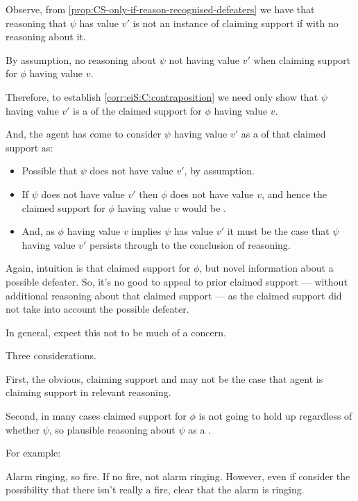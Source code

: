 \begin{note}
  Observe, from \autoref{prop:CS-only-if-reason-recognised-defeaters} we have that reasoning that \(\psi\) has value \(v'\) is not an instance of claiming support {\color{red} if \requ{} with no reasoning about it}.

  By assumption, no reasoning about \(\psi\) not having value \(v'\) when claiming support for \(\phi\) having value \(v\).

  Therefore, to establish \autoref{corr:eiS:C:contraposition} we need only show that \(\psi\) having value \(v'\) is a \requ{} of the claimed support for \(\phi\) having value \(v\).

  And, the agent has come to consider \(\psi\) having value \(v'\) as a \requ{} of that claimed support as:
  \begin{itemize}
  \item Possible that \(\psi\) does not have value \(v'\), by assumption.
  \item If \(\psi\) does not have value \(v'\) then \(\phi\) does not have value \(v\), and hence the claimed support for \(\phi\) having value \(v\) would be \misled{}.
  \item And, as \(\phi\) having value \(v\) implies \(\psi\) has value \(v'\) it must be the case that \(\psi\) having value \(v'\) persists through to the conclusion of reasoning.
  \end{itemize}
\end{note}

\begin{note}
  Again, intuition is that claimed support for \(\phi\), but novel information about a possible defeater.
  So, it's no good to appeal to prior claimed support --- without additional reasoning about that claimed support --- as the claimed support did not take into account the possible defeater.
\end{note}

\begin{note}
  In general, expect this not to be much of a concern.

  Three considerations.
\end{note}

\begin{note}
  First, the obvious, claiming support and may not be the case that agent is claiming support in relevant reasoning.
\end{note}


\begin{note}
  Second, in many cases claimed support for \(\phi\) is not going to hold up regardless of whether \(\psi\), so plausible reasoning about \(\psi\) as a \requ{}.

  For example:

  Alarm ringing, so fire.
  If no fire, not alarm ringing.
  However, even if consider the possibility that there isn't really a fire, clear that the alarm is ringing.
\end{note}

